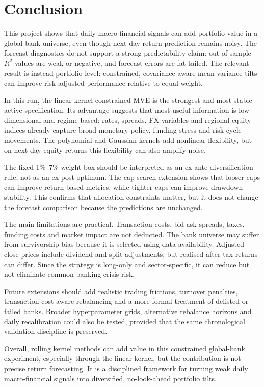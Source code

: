 ﻿\documentclass[10pt,a4paper]{article}
\begin{document}
\section{Conclusion}

This project shows that daily macro-financial signals can add portfolio value in a global bank universe, even though next-day return prediction remains noisy. The forecast diagnostics do not support a strong predictability claim: out-of-sample \(R^2\) values are weak or negative, and forecast errors are fat-tailed. The relevant result is instead portfolio-level: constrained, covariance-aware mean-variance tilts can improve risk-adjusted performance relative to equal weight.

In this run, the linear kernel constrained MVE is the strongest and most stable active specification. Its advantage suggests that most useful information is low-dimensional and regime-based: rates, spreads, FX variables and regional equity indices already capture broad monetary-policy, funding-stress and risk-cycle movements. The polynomial and Gaussian kernels add nonlinear flexibility, but on next-day equity returns this flexibility can also amplify noise.

The fixed 1\%--7\% weight box should be interpreted as an ex-ante diversification rule, not as an ex-post optimum. The cap-search extension shows that looser caps can improve return-based metrics, while tighter caps can improve drawdown stability. This confirms that allocation constraints matter, but it does not change the forecast comparison because the predictions are unchanged.

The main limitations are practical. Transaction costs, bid-ask spreads, taxes, funding costs and market impact are not deducted. The bank universe may suffer from survivorship bias because it is selected using data availability. Adjusted close prices include dividend and split adjustments, but realised after-tax returns can differ. Since the strategy is long-only and sector-specific, it can reduce but not eliminate common banking-crisis risk.

Future extensions should add realistic trading frictions, turnover penalties, transaction-cost-aware rebalancing and a more formal treatment of delisted or failed banks. Broader hyperparameter grids, alternative rebalance horizons and daily recalibration could also be tested, provided that the same chronological validation discipline is preserved.

Overall, rolling kernel methods can add value in this constrained global-bank experiment, especially through the linear kernel, but the contribution is not precise return forecasting. It is a disciplined framework for turning weak daily macro-financial signals into diversified, no-look-ahead portfolio tilts.
\end{document}
